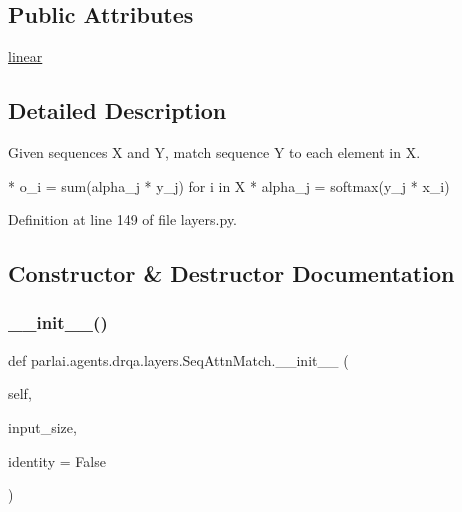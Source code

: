 \subsection*{Public Attributes}
\begin{DoxyCompactItemize}
\item 
\hyperlink{classparlai_1_1agents_1_1drqa_1_1layers_1_1SeqAttnMatch_a6332862a9596fe3e4cb3c323b818a42f}{linear}
\end{DoxyCompactItemize}


\subsection{Detailed Description}
\begin{DoxyVerb}Given sequences X and Y, match sequence Y to each element in X.

* o_i = sum(alpha_j * y_j) for i in X
* alpha_j = softmax(y_j * x_i)
\end{DoxyVerb}
 

Definition at line 149 of file layers.\+py.



\subsection{Constructor \& Destructor Documentation}
\mbox{\label{classparlai_1_1agents_1_1drqa_1_1layers_1_1SeqAttnMatch_abd3be7cddadf751a880aab03c55b0a6c}} 
\subsubsection{\texorpdfstring{\+\_\+\+\_\+init\+\_\+\+\_\+()}{\_\_init\_\_()}}
{\footnotesize\ttfamily def parlai.\+agents.\+drqa.\+layers.\+Seq\+Attn\+Match.\+\_\+\+\_\+init\+\_\+\+\_\+ (\begin{DoxyParamCaption}\item[{}]{self,  }\item[{}]{input\+\_\+size,  }\item[{}]{identity = {\ttfamily False} }\end{DoxyParamCaption})}



